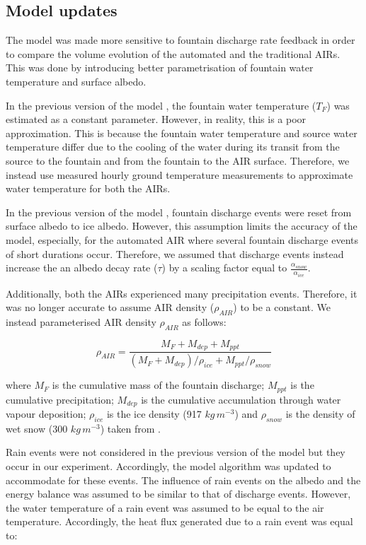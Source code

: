 \documentclass[tc, manuscript]{copernicus}
\begin{document}
\subsection{Model updates}

The model was made more sensitive to fountain discharge rate feedback in order to compare the volume evolution
of the automated and the traditional AIRs. This was done by introducing better parametrisation of fountain water
temperature and surface albedo. 

In the previous version of the model \citep{balasubramanianInfluenceMeteorologicalConditions2022}, the fountain
water temperature ($T_F$) was estimated as a constant parameter. However, in reality, this is a poor
approximation. This is because the fountain water temperature and source water temperature differ due to the
cooling of the water during its transit from the source to the fountain and from the fountain to the AIR
surface. Therefore, we instead use measured hourly ground temperature measurements to approximate water
temperature for both the AIRs.

In the previous version of the model \citep{balasubramanianInfluenceMeteorologicalConditions2022}, fountain
discharge events were reset from surface albedo to ice albedo. However, this assumption limits the accuracy of
the model, especially, for the automated AIR where several fountain discharge events of short durations occur.
Therefore, we assumed that discharge events instead increase the an albedo decay rate ($\tau$) by a scaling
factor equal to $\frac{\alpha_{snow}}{\alpha_{ice}}$.

Additionally, both the AIRs experienced many precipitation events. Therefore, it was no longer accurate to
assume AIR density ($\rho_{AIR}$) to be a constant. We instead parameterised AIR density $\rho_{AIR}$ as follows:

\begin{equation}
  \rho_{AIR} = \frac{M_{F} + M_{dep} + M_{ppt}}{(M_{F} + M_{dep})/\rho_{ice} + M_{ppt}/\rho_{snow}}
\end{equation}

where $M_F$ is the cumulative mass of the fountain discharge; $M_{ppt}$ is the cumulative precipitation;
$M_{dep}$ is the cumulative accumulation through water vapour deposition; $\rho_{ice}$ is the ice density (917
$kg\,m^{-3}$) and $\rho_{snow}$ is the density of wet snow (300 $kg\,m^{-3}$) taken from
\cite{cuffeyPhysicsGlaciers2010} .

Rain events were not considered in the previous version of the model but they occur in our experiment.
Accordingly, the model algorithm was updated to accommodate for these events. The influence of rain events on
the albedo and the energy balance was assumed to be similar to that of discharge events. However, the water
temperature of a rain event was assumed to be equal to the air temperature. Accordingly, the heat flux generated
due to a rain event was equal to:
\end{document}
